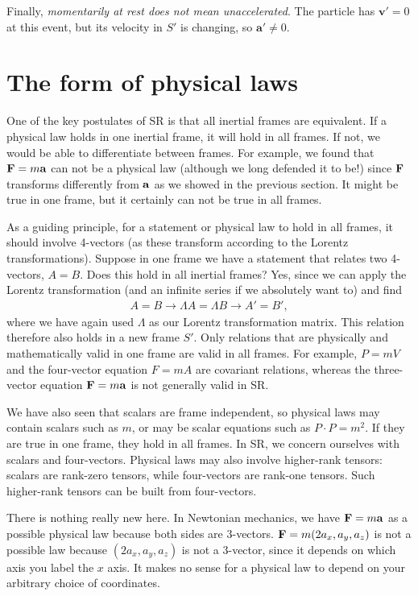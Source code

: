 \documentclass[12pt]{article}
\newcommand{\be}{\begin{eqnarray}}
\newcommand{\ee}{\end{eqnarray}}
\begin{document}
Finally, \emph{momentarily at rest does not mean unaccelerated}. The particle has $\mathbf v'=0$ at this event, but its velocity in $S'$ is changing, so $\mathbf a'\ne0$.

\section{The form of physical laws}\label{sec:physics}

One of the key postulates of SR is that all inertial frames are equivalent. If a physical law holds in one inertial frame, it will hold in all frames. If not, we would be able to differentiate between frames. For example, we found that ${\bf F} = m{\bf a}$ can not be a physical law (although we long defended it to be!) since ${\bf F}$ transforms differently from ${\bf a}$ as we showed in the previous section. It might be true in one frame, but it certainly can not be true in all frames. 

As a guiding principle, for a statement or physical law to hold in all frames, it should involve 4-vectors (as these transform according to the Lorentz transformations). Suppose in one frame we have a statement that relates two 4-vectors, $A = B$. Does this hold in all inertial frames? Yes, since we can apply the Lorentz transformation (and an infinite series if we absolutely want to) and find 
\be
A = B \rightarrow \Lambda A = \Lambda B \rightarrow A'  = B', 
\ee
where we have again used $\Lambda$ as our Lorentz transformation matrix. This relation therefore also holds in a new frame $S'$. Only relations that are physically and mathematically valid in one frame are valid in all frames. For example, $P=mV$ and the four-vector equation $F=mA$ are covariant relations, whereas the three-vector equation ${\bf F}=m{\bf a}$ is not generally valid in SR.

We have also seen that scalars are frame independent, so physical laws may contain scalars such as $m$, or may be scalar equations such as $P\cdot P=m^2$. If they are true in one frame, they hold in all frames. In SR, we concern ourselves with scalars and four-vectors. Physical laws may also involve higher-rank tensors: scalars are rank-zero tensors, while four-vectors are rank-one tensors. Such higher-rank tensors can be built from four-vectors.

There is nothing really new here. In Newtonian mechanics, we have ${\bf F} = m{\bf a}$ as a possible physical law because both sides are 3-vectors. ${\bf F} = m(2a_x,a_y, a_z)$ is not a possible law because $(2a_x, a_y, a_z)$ is not a 3-vector, since it depends on which axis you label the $x$ axis. It makes no sense for a physical law to depend on your arbitrary choice of coordinates. 
\end{document}
